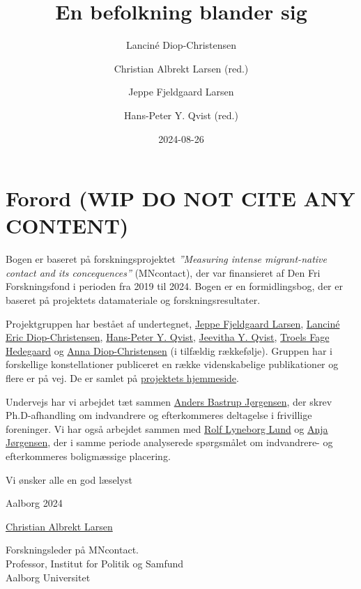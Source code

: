 \documentclass[
]{book}
\title{En befolkning blander sig}
\author{Lanciné Diop-Christensen \and Christian Albrekt Larsen (red.) \and Jeppe Fjeldgaard Larsen \and Hans-Peter Y. Qvist (red.)}
\date{2024-08-26}
\begin{document}
\maketitle

{
\setcounter{tocdepth}{1}
\tableofcontents
}
\chapter*{\texorpdfstring{Forord (\textbf{WIP DO NOT CITE ANY CONTENT})}{Forord (WIP DO NOT CITE ANY CONTENT)}}\label{forord-wip-do-not-cite-any-content}

Bogen er baseret på forskningsprojektet \emph{''Measuring intense migrant-native contact and its concequences''} (MNcontact), der var finansieret af Den Fri Forskningsfond i perioden fra 2019 til 2024. Bogen er en formidlingsbog, der er baseret på projektets datamateriale og forskningsresultater.

Projektgruppen har bestået af undertegnet, \href{https://vbn.aau.dk/da/persons/jeppefl}{Jeppe Fjeldgaard Larsen}, \href{https://vbn.aau.dk/en/persons/led}{Lanciné Eric Diop-Christensen}, \href{https://vbn.aau.dk/da/persons/hpq}{Hans-Peter Y. Qvist}, \href{https://vbn.aau.dk/en/persons/jy}{Jeevitha Y. Qvist}, \href{https://vbn.aau.dk/en/persons/troelsfh}{Troels Fage Hedegaard} og \href{https://dk.linkedin.com/in/anna-diop-christensen-58b5ba282}{Anna Diop-Christensen} (i tilfældig rækkefølje). Gruppen har i forskellige konstellationer publiceret en række videnskabelige publikationer og flere er på vej. De er samlet på \href{https://vbn.aau.dk/en/projects/measuring-intense-migrant-native-contact-and-its-consequences/publications/}{projektets hjemmeside}.

Undervejs har vi arbejdet tæt sammen \href{https://vbn.aau.dk/en/persons/anbajo}{Anders Bastrup Jørgensen}, der skrev Ph.D-afhandling om indvandrere og efterkommeres deltagelse i frivillige foreninger. Vi har også arbejdet sammen med \href{https://vbn.aau.dk/en/persons/rolfll}{Rolf Lyneborg Lund} og \href{https://vbn.aau.dk/en/persons/anjaj}{Anja Jørgensen}, der i samme periode analyserede spørgsmålet om indvandrere- og efterkommeres boligmæssige placering.

Vi ønsker alle en god læselyst

Aalborg 2024

\href{https://vbn.aau.dk/en/persons/albrekt}{Christian Albrekt Larsen}

Forskningsleder på MNcontact.\\
Professor, Institut for Politik og Samfund\\
Aalborg Universitet\\
\end{document}
